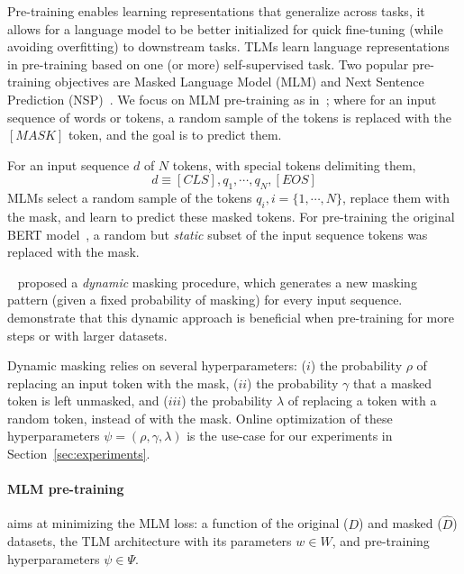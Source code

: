 Pre-training enables learning representations that generalize across tasks,
\ie it allows for a language model to be better initialized for quick fine-tuning (while avoiding overfitting) to downstream tasks.
TLMs learn language representations in pre-training based on one (or more) self-supervised task.
Two popular pre-training objectives are Masked Language Model (MLM) and Next Sentence Prediction (NSP)~\citep{bert}.
%
We focus on MLM pre-training as in~\citep{bert,roberta};
where for an input sequence of words or tokens,
a random sample of the tokens is replaced with the $[MASK]$ token,
and the goal is to predict them.

For an input sequence $d$ of $N$ tokens, with special tokens delimiting them,
\begin{equation}
d \equiv [CLS], q_1, \cdots , q_N, [EOS]
\end{equation}
MLMs select a random sample of the tokens $q_{i}, i=\{1, \cdots, N\}$, replace them with the mask, 
and learn to predict these masked tokens.
For pre-training the original BERT model~\citep{bert}, a random but \textit{static} subset of the input sequence tokens was replaced with the mask.

~\citet{roberta} proposed a \textit{dynamic} masking procedure,
which generates a new masking pattern (given a fixed probability of masking) for every input sequence.
\citet{roberta} demonstrate that this dynamic approach is beneficial when pre-training for more steps or with larger datasets.

Dynamic masking relies on several hyperparameters:
($i$) the probability $\rho$ of replacing an input token with the mask,
($ii$) the probability $\gamma$ that a masked token is left unmasked,
and ($iii$) the probability $\lambda$ of replacing a token with a random token, instead of with the mask.
Online optimization of these hyperparameters $\psi=\left(\rho, \gamma, \lambda\right)$ is the use-case for our experiments in Section~\ref{sec:experiments}.

\paragraph*{MLM pre-training}\hspace*{-2ex}
aims at minimizing the MLM loss:
a function of the original ($D$) and masked ($\widehat{D}$) datasets,
the TLM architecture with its parameters $w\in W$,
and pre-training hyperparameters $\psi\in\Psi$.

